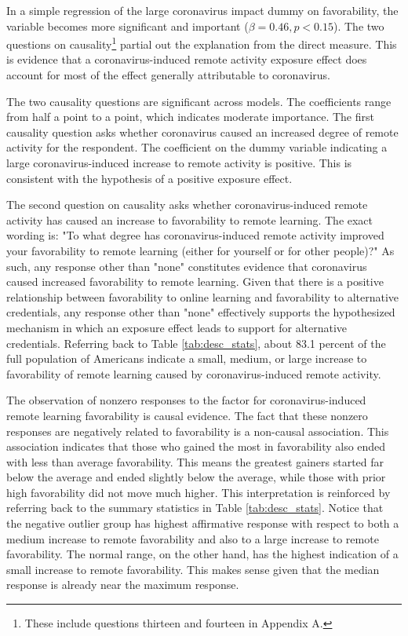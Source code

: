 \documentclass[review]{elsarticle}
\begin{document}
In a simple regression of the large coronavirus impact dummy on favorability,
the variable becomes more significant and important ($\beta = 0.46, p < 0.15$).
The two questions on causality\footnote{These include questions thirteen and fourteen in Appendix A.}
partial out the explanation from the direct measure.
This is evidence that a coronavirus-induced remote activity exposure effect does account for most of the effect generally attributable to coronavirus.

The two causality questions are significant across models.
The coefficients range from half a point to a point, which indicates moderate importance.
The first causality question asks whether coronavirus caused an increased degree of remote activity for the respondent.
The coefficient on the dummy variable indicating a large coronavirus-induced increase to remote activity is positive.
This is consistent with the hypothesis of a positive exposure effect.

The second question on causality asks whether coronavirus-induced remote activity has caused an increase
to favorability to remote learning.
The exact wording is:
"To what degree has coronavirus-induced remote activity improved your favorability to remote learning
(either for yourself or for other people)?"
As such, any response other than "none" constitutes evidence that coronavirus caused increased favorability to remote learning.
Given that there is a positive relationship between favorability to online learning and favorability to alternative credentials,
any response other than "none" effectively supports the hypothesized mechanism in which an exposure effect leads to support for alternative credentials.
Referring back to Table \ref{tab:desc_stats},
about 83.1 percent of the full population of Americans indicate a small,
medium, or large increase to favorability of remote learning
caused by coronavirus-induced remote activity.

The observation of nonzero responses to the factor for coronavirus-induced remote learning favorability is causal evidence.
The fact that these nonzero responses are negatively related to favorability is a non-causal association.
This association indicates that those who gained the most in favorability also ended with less than average favorability.
This means the greatest gainers started far below the average and ended slightly below the average,
while those with prior high favorability did not move much higher.
This interpretation is reinforced by referring back to the summary statistics in Table \ref{tab:desc_stats}.
Notice that the negative outlier group has highest affirmative response with respect to both a
medium increase to remote favorability
and also to a large increase to remote favorability.
The normal range, on the other hand, has the highest indication of a small increase to remote favorability.
This makes sense given that the median response is already near the maximum response.
\end{document}
